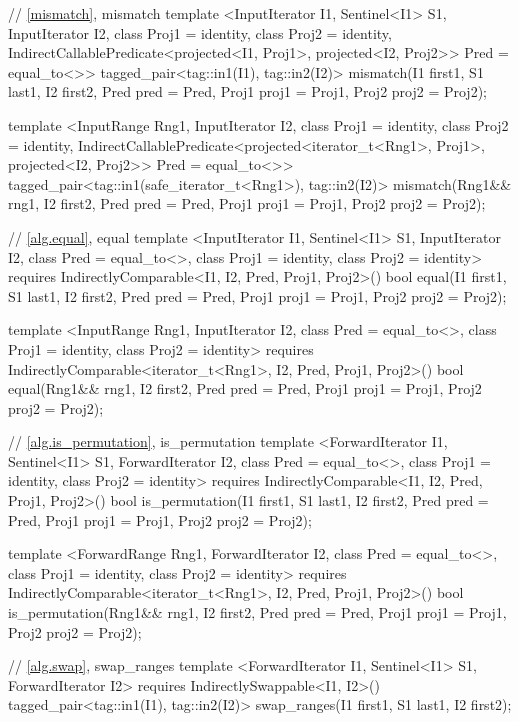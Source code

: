 \begin{codeblock}
// \ref{mismatch}, mismatch
template <InputIterator I1, Sentinel<I1> S1, InputIterator I2,
    class Proj1 = identity, class Proj2 = identity,
    IndirectCallablePredicate<projected<I1, Proj1>, projected<I2, Proj2>> Pred = equal_to<>>
  tagged_pair<tag::in1(I1), tag::in2(I2)>
    mismatch(I1 first1, S1 last1, I2 first2, Pred pred = Pred{},
             Proj1 proj1 = Proj1{}, Proj2 proj2 = Proj2{});

template <InputRange Rng1, InputIterator I2,
    class Proj1 = identity, class Proj2 = identity,
    IndirectCallablePredicate<projected<iterator_t<Rng1>, Proj1>,
      projected<I2, Proj2>> Pred = equal_to<>>
  tagged_pair<tag::in1(safe_iterator_t<Rng1>), tag::in2(I2)>
    mismatch(Rng1&& rng1, I2 first2, Pred pred = Pred{},
             Proj1 proj1 = Proj1{}, Proj2 proj2 = Proj2{});

// \ref{alg.equal}, equal
template <InputIterator I1, Sentinel<I1> S1, InputIterator I2,
    class Pred = equal_to<>, class Proj1 = identity, class Proj2 = identity>
  requires IndirectlyComparable<I1, I2, Pred, Proj1, Proj2>()
  bool equal(I1 first1, S1 last1,
             I2 first2, Pred pred = Pred{},
             Proj1 proj1 = Proj1{}, Proj2 proj2 = Proj2{});

template <InputRange Rng1, InputIterator I2, class Pred = equal_to<>,
    class Proj1 = identity, class Proj2 = identity>
  requires IndirectlyComparable<iterator_t<Rng1>, I2, Pred, Proj1, Proj2>()
  bool equal(Rng1&& rng1, I2 first2, Pred pred = Pred{},
             Proj1 proj1 = Proj1{}, Proj2 proj2 = Proj2{});

// \ref{alg.is_permutation}, is_permutation
template <ForwardIterator I1, Sentinel<I1> S1, ForwardIterator I2,
    class Pred = equal_to<>, class Proj1 = identity, class Proj2 = identity>
  requires IndirectlyComparable<I1, I2, Pred, Proj1, Proj2>()
  bool is_permutation(I1 first1, S1 last1, I2 first2,
                      Pred pred = Pred{},
                      Proj1 proj1 = Proj1{}, Proj2 proj2 = Proj2{});

template <ForwardRange Rng1, ForwardIterator I2, class Pred = equal_to<>,
    class Proj1 = identity, class Proj2 = identity>
  requires IndirectlyComparable<iterator_t<Rng1>, I2, Pred, Proj1, Proj2>()
  bool is_permutation(Rng1&& rng1, I2 first2, Pred pred = Pred{},
                      Proj1 proj1 = Proj1{}, Proj2 proj2 = Proj2{});

// \ref{alg.swap}, swap_ranges
template <ForwardIterator I1, Sentinel<I1> S1, ForwardIterator I2>
  requires IndirectlySwappable<I1, I2>()
  tagged_pair<tag::in1(I1), tag::in2(I2)>
    swap_ranges(I1 first1, S1 last1, I2 first2);


\end{codeblock}
